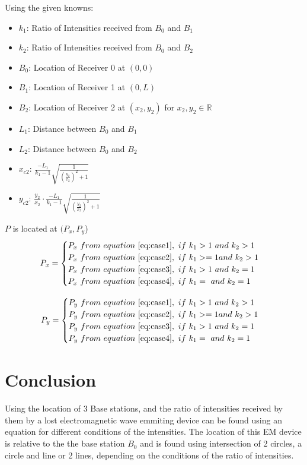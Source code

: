 \documentclass[a4paper,12pt]{article}
\begin{document}
Using the given knowns:
\begin{itemize}
    \item $k_1$: Ratio of Intensities received from $B_0$ and $B_1$
    \item $k_2$: Ratio of Intensities received from $B_0$ and $B_2$
    \item $B_0$: Location of Receiver 0 at $(0,0)$
    \item $B_1$: Location of Receiver 1 at $(0,L)$
    \item $B_2$: Location of Receiver 2 at $(x_2,y_2)$ for $x_2,y_2\in \mathbb{R}$
    \item $L_1$: Distance between $B_0$ and $B_1$
    \item $L_2$: Distance between $B_0$ and $B_2$
    \item $x_{c2}$: $\frac{-L_1}{k_1-1}\sqrt{\frac{1}{\left(\frac{y_2}{x_2}\right)^2+1}}$
    \item $y_{c2}$: $\frac{y_2}{x_2}\cdot\frac{-L_1}{k_1-1}\sqrt{\frac{1}{\left(\frac{y_2}{x_2}\right)^2+1}}$
\end{itemize}
$P$ is located at $(P_x, P_y$)
\begin{equation*}
    P_x=
    \begin{cases}
        P_x~from~equation~\ref{eq:case1},~if~k_1>1~and~k_2>1\\
        P_x~from~equation~\ref{eq:case2},~if~k_1>=1and~k_2>1\\ 
        P_x~from~equation~\ref{eq:case3},~if~k_1>1~and~k_2=1\\
        P_x~from~equation~\ref{eq:case4},~if~k_1=~and~k_2=1\\
    \end{cases}
\end{equation*}

\begin{equation*}
    P_y=
    \begin{cases}
        P_y~from~equation~\ref{eq:case1},~if~k_1>1~and~k_2>1\\
        P_y~from~equation~\ref{eq:case2},~if~k_1>=1and~k_2>1\\ 
        P_y~from~equation~\ref{eq:case3},~if~k_1>1~and~k_2=1\\
        P_y~from~equation~\ref{eq:case4},~if~k_1=~and~k_2=1\\
    \end{cases}
\end{equation*}

\section{Conclusion }
Using the location of 3 Base stations, and the ratio of intensities received by them by a lost electromagnetic wave emmiting device can be found using an equation for different conditions of the intensities. 
The location of this EM device is relative to the the base station $B_0$ and is found using intersection of 2 circles, a circle and line or 2 lines, depending on the conditions of the ratio of intensities.
\end{document}
